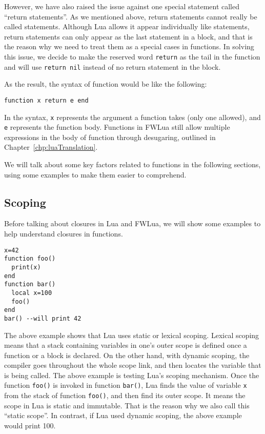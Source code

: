 However, we have also raised the issue against one special statement called ``return statements''. As we mentioned above, return statements cannot really be called statements. Although Lua allows it appear individually like statements, return statements can only appear as the last statement in a block, and that is the reason why we need to treat them as a special cases in functions. In solving this issue, we decide to make the reserved word {\tt return} as the tail in the function and will use {\tt return nil} instead of no return statement in the block.

As the result, the syntax of function would be like the following:
\begin{verbatim}
function x return e end
\end{verbatim}
In the syntax, {\tt x} represents the argument a function takes (only one allowed), and {\tt e} represents the function body. Functions in FWLua still allow multiple expressions in the body of function through desugaring, outlined in Chapter~\ref{chp:luaTranslation}.

We will talk about some key factors related to functions in the following sections, using some examples to make them easier to comprehend.

\subsection{Scoping}
Before talking about closures in Lua and FWLua, we will show some examples to help understand closures in functions.

\begin{verbatim}
x=42
function foo()
  print(x)
end
function bar()
  local x=100
  foo()
end
bar() --will print 42
\end{verbatim}

The above example shows that Lua uses static or lexical scoping. Lexical scoping means that a stack containing variables in one's outer scope is defined once a function or a block is declared. On the other hand, with dynamic scoping, the compiler goes throughout the whole scope link, and then locates the variable that is being called. The above example is testing Lua's scoping mechanism. Once the function {\tt foo()} is invoked in function {\tt bar()}, Lua finds the value of variable {\tt x} from the stack of function {\tt foo()}, and then find its outer scope. It means the scope in Lua is static and immutable. That is the reason why we also call this ``static scope''. In contrast, if Lua used dynamic scoping, the above example would print 100.


